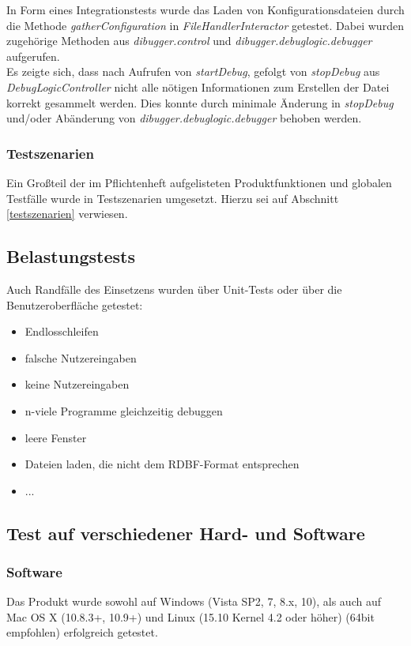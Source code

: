 \documentclass[parskip=full]{scrartcl}
\begin{document}
In Form eines Integrationstests wurde das Laden von Konfigurationsdateien durch die Methode \textit{gatherConfiguration} in \textit{FileHandlerInteractor} getestet.
Dabei wurden zugehörige Methoden aus \textit{dibugger.control} und \textit{dibugger.debuglogic.debugger} aufgerufen.\\
Es zeigte sich, dass nach Aufrufen von \textit{startDebug}, gefolgt von \textit{stopDebug} aus \textit{DebugLogicController} nicht alle nötigen Informationen zum Erstellen der Datei korrekt gesammelt werden.
Dies konnte durch minimale Änderung in \textit{stopDebug} und/oder Abänderung von \textit{dibugger.debuglogic.debugger} behoben werden. %

\subsubsection{Testszenarien}
Ein Großteil der im Pflichtenheft aufgelisteten Produktfunktionen und globalen Testfälle wurde in Testszenarien umgesetzt. Hierzu sei auf Abschnitt \ref{testszenarien} verwiesen.

\subsection{Belastungstests}\label{stress}
Auch Randfälle des Einsetzens wurden über Unit-Tests oder über die Benutzeroberfläche getestet: 
\begin{itemize}
\item Endlosschleifen
\item falsche Nutzereingaben
\item keine Nutzereingaben
\item n-viele Programme gleichzeitig debuggen
\item leere Fenster
\item Dateien laden, die nicht dem RDBF-Format entsprechen
\item ...

\end{itemize}

\subsection{Test auf verschiedener Hard- und Software}

\subsubsection{Software}
Das Produkt wurde sowohl auf Windows (Vista SP2, 7, 8.x, 10), als auch auf Mac OS X (10.8.3+, 10.9+) und Linux (15.10 Kernel 4.2 oder höher) (64bit empfohlen) erfolgreich getestet.
\end{document}
